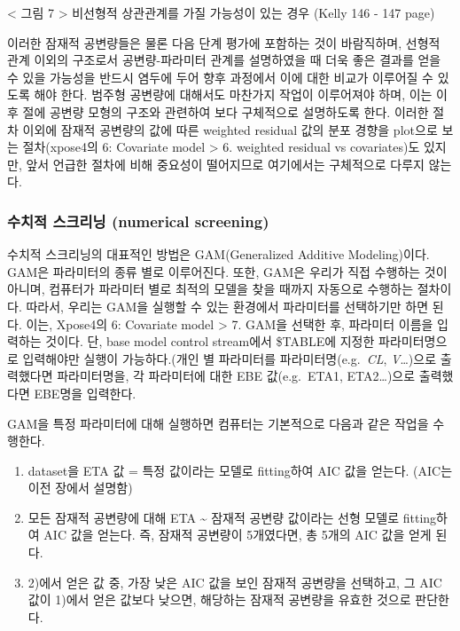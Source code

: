 \documentclass[
  10pt,
]{krantz}
\begin{document}
\textless{} 그림 7 \textgreater{} 비선형적 상관관계를 가질 가능성이 있는 경우 (Kelly 146 - 147 page)

이러한 잠재적 공변량들은 물론 다음 단계 평가에 포함하는 것이 바람직하며, 선형적 관계 이외의 구조로서 공변량-파라미터 관계를
설명하였을 때 더욱 좋은 결과를 얻을 수 있을 가능성을 반드시 염두에 두어 향후 과정에서 이에 대한 비교가 이루어질 수
있도록 해야 한다. 범주형 공변량에 대해서도 마찬가지 작업이 이루어져야 하며, 이는 이후 절에 공변량 모형의 구조와
관련하여 보다 구체적으로 설명하도록 한다. 이러한 절차 이외에 잠재적 공변량의 값에 따른 weighted
residual 값의 분포 경향을 plot으로 보는 절차(xpose4의 6: Covariate model \textgreater{} 6.
weighted residual vs covariates)도 있지만, 앞서 언급한 절차에 비해 중요성이 떨어지므로 여기에서는
구체적으로 다루지 않는다.

\hypertarget{uxc218uxce58uxc801-uxc2a4uxd06cuxb9acuxb2dd-numerical-screening}{%
\subsubsection{수치적 스크리닝 (numerical screening)}\label{uxc218uxce58uxc801-uxc2a4uxd06cuxb9acuxb2dd-numerical-screening}}

수치적 스크리닝의 대표적인 방법은 GAM(Generalized Additive Modeling)이다. GAM은 파라미터의 종류
별로 이루어진다. 또한, GAM은 우리가 직접 수행하는 것이 아니며, 컴퓨터가 파라미터 별로 최적의 모델을 찾을 때까지
자동으로 수행하는 절차이다. 따라서, 우리는 GAM을 실행할 수 있는 환경에서 파라미터를 선택하기만 하면 된다. 이는,
Xpose4의 6: Covariate model \textgreater{} 7. GAM을 선택한 후, 파라미터 이름을 입력하는 것이다. 단, base
model control stream에서 \$TABLE에 지정한 파라미터명으로 입력해야만 실행이 가능하다.(개인 별 파라미터를
파라미터명(e.g.~\emph{CL}, \emph{V}\ldots)으로 출력했다면 파라미터명을, 각 파라미터에 대한 EBE 값(e.g.~ETA1,
ETA2\ldots)으로 출력했다면 EBE명을 입력한다.

GAM을 특정 파라미터에 대해 실행하면 컴퓨터는 기본적으로 다음과 같은 작업을 수행한다.

\begin{enumerate}
\def\labelenumi{\arabic{enumi})}
\item
  dataset을 ETA 값 = 특정 값이라는 모델로 fitting하여 AIC 값을 얻는다. (AIC는 이전 장에서 설명함)
\item
  모든 잠재적 공변량에 대해 ETA \textasciitilde{} 잠재적 공변량 값이라는 선형 모델로 fitting하여 AIC 값을 얻는다. 즉,
  잠재적 공변량이 5개였다면, 총 5개의 AIC 값을 얻게 된다.
\item
  2)에서 얻은 값 중, 가장 낮은 AIC 값을 보인 잠재적 공변량을 선택하고, 그 AIC 값이 1)에서 얻은 값보다
  낮으면, 해당하는 잠재적 공변량을 유효한 것으로 판단한다.
\end{enumerate}
\end{document}
